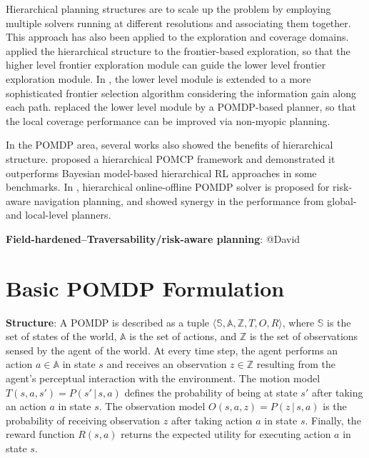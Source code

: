 \documentclass{article}
\newcommand{\ph}[1]{{\textbf{#1}:}} %
\begin{document}
Hierarchical planning structures are to scale up the problem by employing multiple solvers running at different resolutions and associating them together.
This approach has also been applied to the exploration and coverage domains.
%
\citet{umari2017autonomous} applied the hierarchical structure to the frontier-based exploration, so that the higher level frontier exploration module can guide the lower level frontier exploration module.
In \cite{dang2019explore}, the lower level module is extended to a more sophisticated frontier selection algorithm considering the information gain along each path.
\citet{Lauri2016planning} replaced the lower level module by a POMDP-based planner, so that the local coverage performance can be improved via non-myopic planning.

In the POMDP area, several works also showed the benefits of hierarchical structure.
\citet{vien2015hierarchical} proposed a hierarchical POMCP framework and demonstrated it outperforms Bayesian model-based hierarchical RL approaches in some benchmarks.
In \cite{kim2019bi}, hierarchical online-offline POMDP solver is proposed for risk-aware navigation planning, and showed synergy in the performance from global- and local-level planners.



\ph{Field-hardened--Traversability/risk-aware planning}
@David



\section{Basic POMDP Formulation}

\ph{Structure} A POMDP is described as a tuple $\langle \mathbb{S}, \mathbb{A}, \mathbb{Z}, T, O, R \rangle$, where $\mathbb{S}$ is the set of states of the world, $\mathbb{A}$ is the set of actions, and $\mathbb{Z}$ is the set of observations sensed by the agent of the world. At every time step, the agent performs an action $a \in \mathbb{A}$ in state $s$ and receives an observation $z \in \mathbb{Z}$ resulting from the agent's perceptual interaction with the environment. The motion model $T(s, a, s') = P(s'\,|\,s, a)$ defines the probability of being at state $s'$ after taking an action $a$ in state $s$. The observation model $O(s, a, z) = P(z\,|\,s, a)$ is the probability of receiving observation $z$ after taking action $a$ in state $s$. Finally, the reward function $R(s,a)$ returns the expected utility for executing action $a$ in state $s$.
\end{document}
